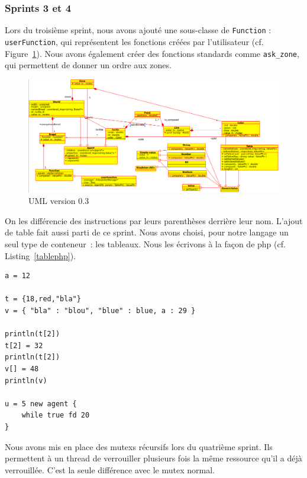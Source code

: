 \subsubsection{Sprints 3 et 4}
Lors du troisième sprint, nous avons ajouté une sous-classe de \verb|Function| : \verb|userFunction|, qui représentent les fonctions créées par l'utilisateur (cf. Figure~\ref{v0.3}). Nous avons également créer des fonctions standards comme \verb|ask_zone|, qui permettent de donner un ordre aux zones.
\begin{figure}[h]
\includegraphics[scale=0.4]{doc/report/uml/v03.png}
\caption{\label{v0.3} UML version 0.3}
\end{figure}

On les différencie des instructions par leurs parenthèses derrière leur nom.
L'ajout de table fait aussi parti de ce sprint. Nous avons choisi, pour notre langage un seul type de conteneur~: les tableaux.
Nous les écrivons à la façon de php (cf. Listing~\ref{tablephp}).
\begin{lstlisting}[label=tablephp,caption=Syntaxe des tables en Stibbons]
a = 12

t = {18,red,"bla"}
v = { "bla" : "blou", "blue" : blue, a : 29 }

println(t[2])
t[2] = 32
println(t[2])
v[] = 48
println(v)

u = 5 new agent {
	while true fd 20
}
\end{lstlisting}

Nous avons mis en place des mutexs récursifs lors du quatrième sprint. Ils permettent à un thread de verrouiller plusieurs fois la même ressource qu'il a déjà verrouillée. C'est la seule différence avec le mutex normal. 

